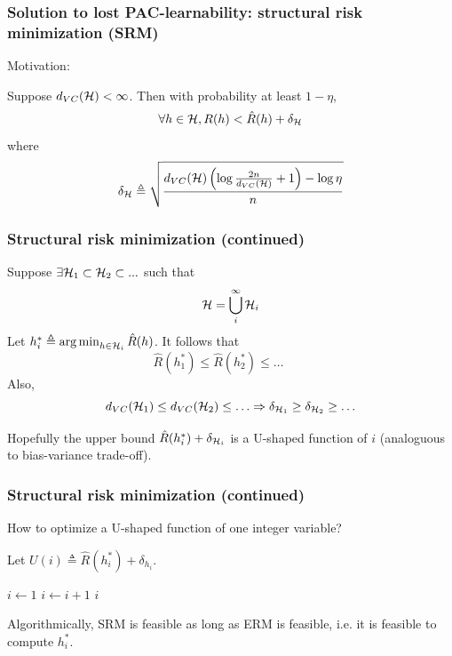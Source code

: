 \documentclass{beamer}
\DeclareMathOperator*{\argmin}{arg\,min}
\begin{document}
\begin{frame}

\frametitle{Solution to lost PAC-learnability: structural risk minimization (SRM) \cite{vapnik1992principles}}

Motivation:
\begin{theorem}
Suppose $d_{VC} ({\mathcal H}) < \infty$.
Then with probability at least $1 - \eta$,
\[
\forall h \in {\mathcal H}, R (h) < \hat{R} (h) + \delta_{\mathcal H}
\]
where
\[
\delta_{\mathcal H} \triangleq \sqrt{\frac{d_{VC} ({\mathcal H}) \left(\log \frac{2 n}{d_{VC} ({\mathcal H})} + 1\right) - \log \eta}{n}}
\]
\end{theorem}

\end{frame}

\begin{frame}

\frametitle{Structural risk minimization (continued)}

Suppose $\exists {\mathcal H}_1 \subset {\mathcal H}_2 \subset ...$ such that
\[
{\mathcal H} = \bigcup_i^\infty {\mathcal H}_i
\]
Let $h_i^* \triangleq \argmin_{h \in \calh_i} \hat{R} (h)$.
It follows that
\[
\hat{R} (h_1^*) \leq \hat{R} (h_2^*) \leq \ldots \qquad
\]
Also,
\[
d_{VC} ({\mathcal H}_1) \leq d_{VC} ({\mathcal H}_2) \leq \ldots
\Rightarrow \delta_{{\mathcal H}_1} \geq \delta_{{\mathcal H}_2} \geq \ldots
\]

Hopefully the upper bound $\hat{R}(h_i^*) + \delta_{{\mathcal H}_i}$ is a U-shaped function of $i$ (analoguous to bias-variance trade-off).

\end{frame}

\begin{frame}

\frametitle{Structural risk minimization (continued)}

How to optimize a U-shaped function of one integer variable?

Let $U(i) \triangleq \hat{R}(h_i^*) + \delta_{h_i}$.
\begin{algorithmic}
\STATE $i \gets 1$
    \STATE $i \gets i + 1$
\ENDWHILE
\RETURN $i$
\end{algorithmic}

Algorithmically, SRM is feasible as long as ERM is feasible, i.e. it is feasible to compute $h_i^*$.

\end{frame}
\end{document}
